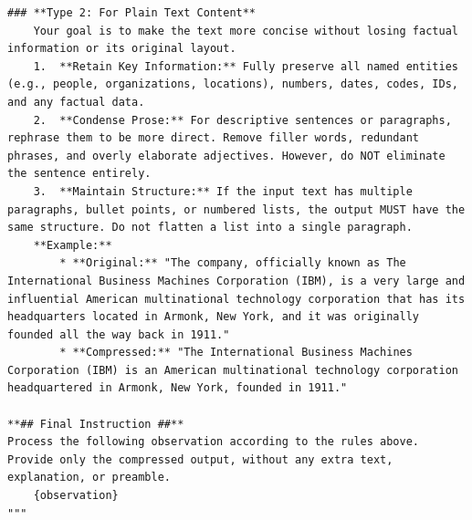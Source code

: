 \begin{tcolorbox}[
        colback=gray!5!white,
        colframe=gray!50!black,
        title=Prompt for "excessive observation length",
        floatplacement=Hp,
        breakable  %
    ]
\begin{lstlisting}[basicstyle=\ttfamily\small, breaklines=true, columns=fixed, breakindent=0pt, xleftmargin=0pt, gobble=0]
### **Type 2: For Plain Text Content**
    Your goal is to make the text more concise without losing factual information or its original layout.
    1.  **Retain Key Information:** Fully preserve all named entities (e.g., people, organizations, locations), numbers, dates, codes, IDs, and any factual data.
    2.  **Condense Prose:** For descriptive sentences or paragraphs, rephrase them to be more direct. Remove filler words, redundant phrases, and overly elaborate adjectives. However, do NOT eliminate the sentence entirely.
    3.  **Maintain Structure:** If the input text has multiple paragraphs, bullet points, or numbered lists, the output MUST have the same structure. Do not flatten a list into a single paragraph.
    **Example:**
        * **Original:** "The company, officially known as The International Business Machines Corporation (IBM), is a very large and influential American multinational technology corporation that has its headquarters located in Armonk, New York, and it was originally founded all the way back in 1911."
        * **Compressed:** "The International Business Machines Corporation (IBM) is an American multinational technology corporation headquartered in Armonk, New York, founded in 1911."

**## Final Instruction ##**
Process the following observation according to the rules above. Provide only the compressed output, without any extra text, explanation, or preamble.
    {observation}
"""
\end{lstlisting}
\end{tcolorbox}


